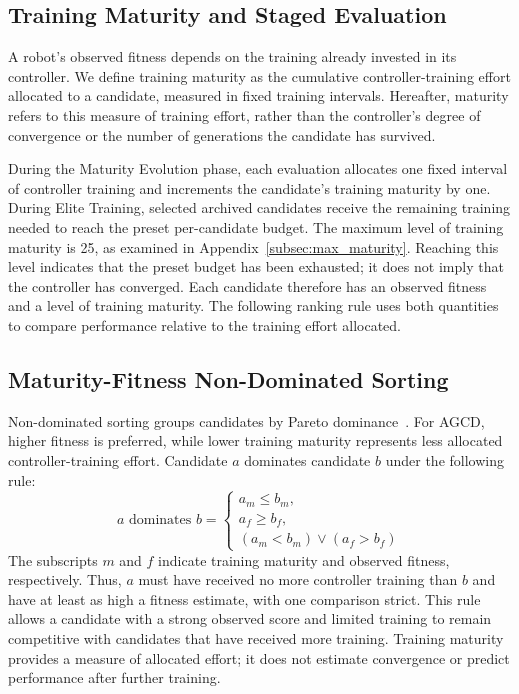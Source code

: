 \documentclass{article}
\begin{document}
    \subsection{Training Maturity and Staged Evaluation}
    \label{subsec:multi_maturity} A robot's observed fitness depends on the
    training already invested in its controller. We define training maturity
    as the cumulative controller-training effort allocated to a candidate,
    measured in fixed training intervals. Hereafter, maturity refers to this
    measure of training effort, rather than the controller's degree of convergence
    or the number of generations the candidate has survived.

    During the Maturity Evolution phase, each evaluation allocates one fixed
    interval of controller training and increments the candidate's training
    maturity by one. During Elite Training, selected archived candidates
    receive the remaining training needed to reach the preset per-candidate
    budget. The maximum level of training maturity is 25, as examined in
    Appendix~\ref{subsec:max_maturity}. Reaching this level indicates that the
    preset budget has been exhausted; it does not imply that the controller
    has converged. Each candidate therefore has an observed fitness and a
    level of training maturity. The following ranking rule uses both quantities
    to compare performance relative to the training effort allocated.

    \subsection{Maturity-Fitness Non-Dominated Sorting}
    \label{subsec:maturity_fitness} Non-dominated sorting groups candidates by
    Pareto dominance~\cite{srinivas1994muiltiobjective,deb2002fast}. For AGCD,
    higher fitness is preferred, while lower training maturity represents
    less allocated controller-training effort. Candidate $a$ dominates
    candidate $b$ under the following rule:
    \begin{equation}
        \label{eq:mf_dominance}a\text{ dominates }b = \left\{
        \begin{array}{l}
            a_m \le b_m,                                       \\
            a_f \ge b_f,                                       \\
            \left(a_m < b_m\right) \lor \left(a_f > b_f\right)
        \end{array}
        \right.
    \end{equation}
    The subscripts $m$ and $f$ indicate training maturity and observed fitness,
    respectively. Thus, $a$ must have received no more controller training than
    $b$ and have at least as high a fitness estimate, with one comparison
    strict. This rule allows a candidate with a strong observed score and
    limited training to remain competitive with candidates that have received
    more training. Training maturity provides a measure of allocated effort;
    it does not estimate convergence or predict performance after further
    training.
\end{document}
